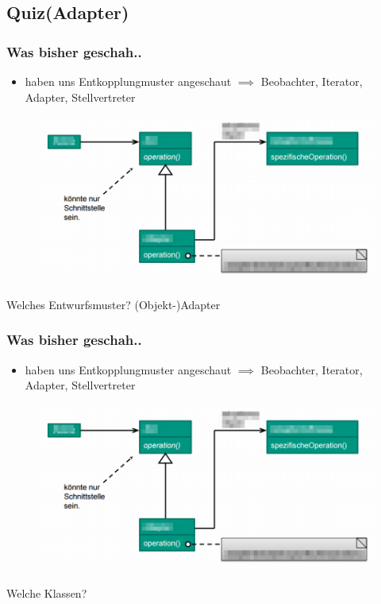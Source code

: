 \documentclass[18pt]{beamer}
\begin{document}
	\subsection{Quiz(Adapter)}
	\begin{frame}
		\frametitle{Was bisher geschah..}
		\begin{itemize}
			\item haben uns Entkopplungmuster angeschaut \pause
			\linebreak $\implies$ Beobachter, Iterator, Adapter, Stellvertreter \pause
		\end{itemize}
		\begin{figure}
			\includegraphics[scale=0.33]{./pics/tut4/adap-obj-mod.png}
		\end{figure}
		Welches Entwurfsmuster? \pause (Objekt-)Adapter
	\end{frame}
	
	\begin{frame}
		\frametitle{Was bisher geschah..}
		\begin{itemize}
			\item haben uns Entkopplungmuster angeschaut
			\linebreak $\implies$ Beobachter, Iterator, Adapter, Stellvertreter
		\end{itemize}
		\begin{figure}
			\includegraphics[scale=0.33]{./pics/tut4/adap-obj-mod.png}
		\end{figure}
		Welche Klassen?
	\end{frame}
	
\end{document}
